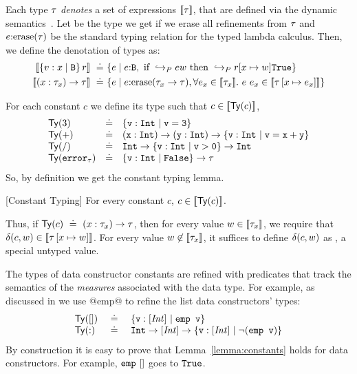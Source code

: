 %
Each type $\tau$ \emph{denotes} a set of expressions $[\![\tau]\!]$,
that are defined via the dynamic semantics~\cite{Knowles10}.
%
Let \erase{\typ} be the type we get if we erase all refinements 
from $\tau$ and $e\text{:}\text{erase}(\tau)$ be the 
standard typing relation for the typed lambda calculus.
%
Then, we define the denotation of types as: 
\begin{align*}
\interp{\tref{x}{\ttbase}{}{r}} \defeq & 
    \{e \mid  \hastypebasesmall{\emptyset}{e}{\ttbase},
              \mbox{ if } \evals{e}{w} 
              \mbox{ then } \evals{\SUBST{r}{x}{w}}{\etrue} \}\\
\interp{\tfun{x}{\typ_x}{\typ}} \defeq & 
    \{e \mid  \hastypebasesmall{\emptyset}{e}{\erase{\tfunbasic{\typ_x}{\typ}}}, 
              \forall e_x \in \interp{\typ_x}.\ \eapp{e}{e_x} \in \interp{\typ\sub{x}{e_x}}
    \}
\end{align*}


For each constant $c$ we define its type 
such that $c \in [\![\mathsf{Ty}({c})]\!]$, \eg
%
$$
\begin{array}{lcl}
\mathsf{Ty}({3}) &\doteq& {\{ \mathtt{v}:\mathtt{\mathtt{Int}^{}} \mid \mathtt{v = 3} \}}\\
\mathsf{Ty}({+}) &\doteq& {(\mathtt{x}:\mathtt{Int})} \rightarrow {(\mathtt{y}:\ensuremath{\mathtt{Int}})} \rightarrow {\{ \ensuremath{\mathtt{v}:\mathtt{\mathtt{Int}^{}}} \mid \mathtt{v = x + y} \}}\\
\mathsf{Ty}({/}) &\doteq& {\mathtt{Int}} \rightarrow {\ensuremath{{{\{ \mathtt{v}:\mathtt{\mathtt{Int}^{}} \mid \mathtt{v > 0} \}}} \rightarrow {\ensuremath{\mathtt{Int}}}}}\\
\mathsf{Ty}({\mathtt{error}_{\tau}}) &\doteq& {{\{ \mathtt{v}:\mathtt{\mathtt{Int}^{}} \mid \mathtt{\mathtt{False}} \}}} \rightarrow {\ensuremath{\tau}}
\end{array}
$$
%
So, by definition we get the constant typing lemma.
%
\begin{lemma}{[Constant Typing]}\label{lemma:constants}
For every constant $c$, $c \in [\![\mathsf{Ty}({c})]\!]$.
\end{lemma}
%
Thus, if $\mathsf{Ty}({c}) \ \doteq\  {(x:\tau_x)} \rightarrow \tau$, then for every value 
$w \in [\![\tau_x]\!]$, we require that $\delta(c, w) \in [\![\tau \left[ x \mapsto w \right] ]\!]$.
%
For every value $w \not \in [\![\tau_x]\!]$, it suffices to define $\delta(c, w)$
as \ecrash, a special untyped value.

The types of data constructor constants are refined 
with predicates that track the semantics of the 
\emph{measures} associated with the data type.
%
For example, as discussed in  
we use @emp@ to refine the list data constructors' types:
$$
\begin{array}{lcl}
\mathsf{Ty}({[]})  & \ \doteq\  & {\{ \mathtt{v}:\mathtt{[\mathit{Int}]^{}} \mid \mathtt{\texttt{emp } {v}} \}}\\
\mathsf{Ty}({:})  & \ \doteq\  & {\mathtt{Int}} \rightarrow {\ensuremath{{[\mathit{Int}]} \rightarrow {\ensuremath{{\{ \mathtt{v}:\mathtt{[\mathit{Int}]^{}} \mid \mathtt{\lnot (\texttt{emp } {v})} \}}}}}}
\end{array}
$$
%
By construction it is easy to prove that Lemma~\ref{lemma:constants}
holds for data constructors.
%
For example, $\ttemp\ \dnull$ goes to $\mathtt{True}$.
%


